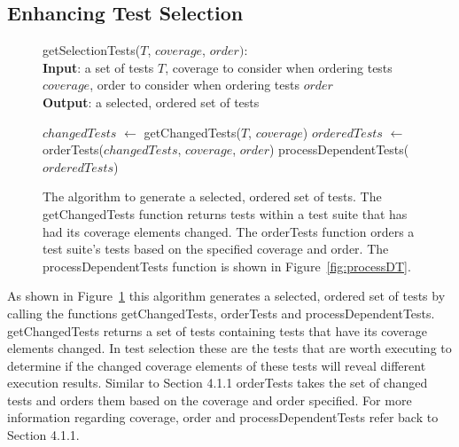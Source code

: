 \subsection{Enhancing Test Selection}
\begin{figure}[t]
	getSelectionTests($\mathit{T}$, $\mathit{coverage}$, $\mathit{order}):$\\
	\textbf{Input}: a set of tests $\mathit{T}$, coverage to consider when ordering
	tests $\mathit{coverage}$, order to consider when ordering tests $\mathit{order}$\\
	\textbf{Output}: a selected, ordered set of tests\\
	 \begin{algorithmic}[1]
	 	\vspace{-5mm}
	 	\STATE $\mathit{changedTests}$ $\leftarrow$ getChangedTests($\mathit{T}$,
	 	$\mathit{coverage}$)
		\STATE $\mathit{orderedTests}$ $\leftarrow$ orderTests($\mathit{changedTests}$,
		$\mathit{coverage}$, $\mathit{order}$)
		\RETURN processDependentTests($\mathit{orderedTests}$)
	\end{algorithmic}
	\vspace{-3mm}
	\caption {
		The algorithm to generate a selected, ordered set of tests. The
		getChangedTests function returns tests within a test suite that has had its
		coverage elements changed. The orderTests function orders a test suite's tests
		based on the specified coverage and order. The processDependentTests function
		is shown in Figure~\ref{fig:processDT}.
	}
	\label{fig:selection}
\end{figure}
As shown in Figure~\ref{fig:selection} this algorithm generates a selected,
ordered set of tests by calling the functions getChangedTests, orderTests and
processDependentTests. getChangedTests returns a set of tests containing tests
that have its coverage elements changed. In test selection these are the tests
that are worth executing to determine if the changed coverage elements of these
tests will reveal different execution results. Similar to Section 4.1.1
orderTests takes the set of changed tests and orders them based on the coverage
and order specified. For more information regarding coverage, order and
processDependentTests refer back to Section 4.1.1.

